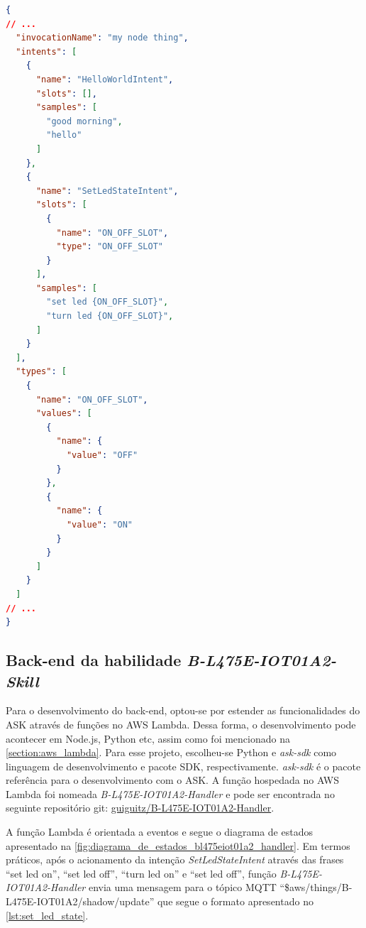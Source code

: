 \begin{lstlisting}[float=htbp,language=json,firstnumber=1,caption={Trecho do arquivo JSON que descreve o front-end da habilidade \textit{B-L475E-IOT01A2-Skill}.},label=lst:frontend_bl475eiot01a2_skill]
{
// ...
  "invocationName": "my node thing",
  "intents": [
    {
      "name": "HelloWorldIntent",
      "slots": [],
      "samples": [
        "good morning",
        "hello"
      ]
    },
    {
      "name": "SetLedStateIntent",
      "slots": [
        {
          "name": "ON_OFF_SLOT",
          "type": "ON_OFF_SLOT"
        }
      ],
      "samples": [
        "set led {ON_OFF_SLOT}",
        "turn led {ON_OFF_SLOT}",
      ]
    }
  ],
  "types": [
    {
      "name": "ON_OFF_SLOT",
      "values": [
        {
          "name": {
            "value": "OFF"
          }
        },
        {
          "name": {
            "value": "ON"
          }
        }
      ]
    }
  ]
// ...
}
\end{lstlisting}

\subsection{Back-end da habilidade \textit{B-L475E-IOT01A2-Skill}}\label{subscrion:backend_bl475eiot01a2_skill}

Para o desenvolvimento do back-end, optou-se por estender as funcionalidades do ASK através de funções no AWS Lambda. Dessa forma, o desenvolvimento pode acontecer em Node.js, Python etc, assim como foi mencionado na \autoref{section:aws_lambda}. Para esse projeto, escolheu-se Python e \textit{ask-sdk} como linguagem de desenvolvimento e pacote SDK, respectivamente. \textit{ask-sdk} é o pacote referência para o desenvolvimento com o ASK. A função hospedada no AWS Lambda foi nomeada \textit{B-L475E-IOT01A2-Handler} e pode ser encontrada no seguinte repositório git: \href{https://github.com/guiguitz/B-L475E-IOT01A2-Handler}{guiguitz/B-L475E-IOT01A2-Handler}.

A função Lambda é orientada a eventos e segue o diagrama de estados apresentado na \autoref{fig:diagrama_de_estados_bl475eiot01a2_handler}. Em termos práticos, após o acionamento da intenção \textit{SetLedStateIntent} através das frases ``set led on'', ``set led off'', ``turn led on'' e ``set led off'', função \textit{B-L475E-IOT01A2-Handler} envia uma mensagem para o tópico MQTT ``\$aws/things/B-L475E-IOT01A2/shadow/update'' que segue o formato apresentado no \autoref{lst:set_led_state}.

